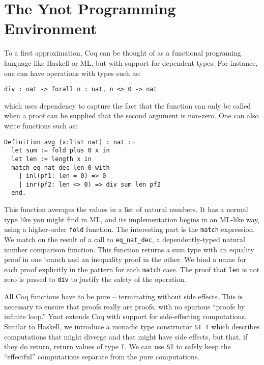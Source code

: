 \documentclass[preprint,nocopyrightspace]{sigplanconf}
\newcommand{\cd}[1]{\texttt{#1}}
\begin{document}
\section{\label{tutorial}The Ynot Programming Environment}

To a first approximation, Coq can be thought of as a functional
programing language like Haskell or ML, but with support for dependent
types.  For instance, one can have operations with types such as:
\begin{verbatim}
div : nat -> forall n : nat, n <> 0 -> nat
\end{verbatim}
which uses dependency to capture the fact that the function can only
be called when a proof can be supplied that the second argument is
non-zero.  One can also write functions such as:
\begin{verbatim}
Definition avg (x:list nat) : nat :=
  let sum := fold plus 0 x in
  let len := length x in
  match eq_nat_dec len 0 with
    | inl(pf1: len = 0) => 0
    | inr(pf2: len <> 0) => div sum len pf2
  end.
\end{verbatim}

This function averages the values in a list of natural numbers.  It has a normal type like you might find in ML, and its implementation begins in an ML-like way, using a higher-order \cd{fold} function.  The interesting part is the \cd{match} expression.  We match on the result of a call to \cd{eq\_nat\_dec}, a dependently-typed natural number comparison function.  This function returns a sum type with an equality proof in one branch and an inequality proof in the other. We bind a name for each proof explicitly in the pattern for each \cd{match} case.  The proof that \cd{len} is not zero is passed to \cd{div} to justify the safety of the operation.

All Coq functions have to be pure -- terminating without side effects.  This is necessary to ensure that proofs really are proofs, with no spurious ``proofs by infinite loop.''  Ynot extends Coq with support for side-effecting computations.  Similar to Haskell, we introduce a monadic type constructor \cd{ST T} which describes computations that might diverge and that might have side effects, but that, if they do return, return values of type \cd{T}.  We can use \cd{ST} to safely keep the ``effectful'' computations separate from the pure computations.
\end{document}
